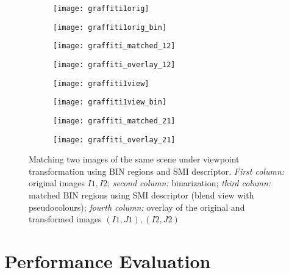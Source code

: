 \documentclass[a4paper,11pt]{article}
\begin{document}
\begin{figure}[h]
 \vspace{-10pt} 
\begin{center}
\begin{subfigure}[b]{0.22\textwidth}
  \texttt{[image: graffiti1orig]}
\end{subfigure}
\begin{subfigure}[b]{0.22\textwidth}
\texttt{[image: graffiti1orig\_bin]}
\end{subfigure}
\begin{subfigure}[b]{0.22\textwidth}
  \texttt{[image: graffiti\_matched\_12]}
\end{subfigure}
\begin{subfigure}[b]{0.22\textwidth}
\texttt{[image: graffiti\_overlay\_12]}
\end{subfigure}
\end{center}
\vspace{-22pt}
\begin{center}
\begin{subfigure}[b]{0.22\textwidth}
  \texttt{[image: graffiti1view]}
\end{subfigure}
\begin{subfigure}[b]{0.22\textwidth}
\texttt{[image: graffiti1view\_bin]}
\end{subfigure}
\begin{subfigure}[b]{0.22\textwidth}
  \texttt{[image: graffiti\_matched\_21]}
\end{subfigure}
\begin{subfigure}[b]{0.22\textwidth}
\texttt{[image: graffiti\_overlay\_21]}
\end{subfigure}
\end{center}
\vspace{-20pt}
\caption{\small Matching two images of the same scene under viewpoint transformation using BIN regions and SMI descriptor. {\em First column:} original images $I1, I2$; {\em second column:} binarization; {\em third column:} matched BIN regions using SMI descriptor (blend view with pseudocolours); {\em fourth column:} overlay of the original and transformed images $(I1, J1), (I2, J2)$ }
\label{fig:matching1}
  \vspace{-12pt}
\end{figure}

\section{Performance Evaluation}
\end{document}
